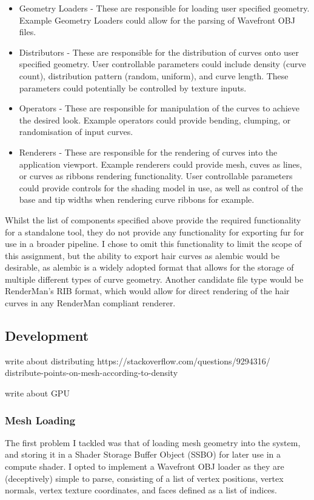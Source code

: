 \documentclass[]{acmsiggraph}
\begin{document}
\begin{itemize}
	\item Geometry Loaders - These are responsible for loading user specified geometry. Example Geometry Loaders could allow for the parsing of Wavefront OBJ files.
	\item Distributors - These are responsible for the distribution of curves onto user specified geometry. User controllable parameters could include density (curve count), distribution pattern (random, uniform), and curve length. These parameters could potentially be controlled by texture inputs.
	\item Operators - These are responsible for manipulation of the curves to achieve the desired look. Example operators could provide bending, clumping, or randomisation of input curves.
	\item Renderers - These are responsible for the rendering of curves into the application viewport. Example renderers could provide mesh, cuves as lines, or curves as ribbons rendering functionality. User controllable parameters could provide controls for the shading model in use, as well as control of the base and tip widths when rendering curve ribbons for example.
\end{itemize}

Whilst the list of components specified above provide the required functionality for a standalone tool, they do not provide any functionality for exporting fur for use in a broader pipeline. I chose to omit this functionality to limit the scope of this assignment, but the ability to export hair curves as alembic would be desirable, as alembic is a widely adopted format that allows for the storage of multiple different types of curve geometry. Another candidate file type would be RenderMan's RIB format, which would allow for direct rendering of the hair curves in any RenderMan compliant renderer.

\subsection{Development} \label{sec:development}

write about distributing https://stackoverflow.com/questions/9294316/
distribute-points-on-mesh-according-to-density

write about GPU

\subsubsection{Mesh Loading} \label{sec:objLoading}
The first problem I tackled was that of loading mesh geometry into the system, and storing it in a Shader Storage Buffer Object (SSBO) for later use in a compute shader. I opted to implement a Wavefront OBJ loader as they are (deceptively) simple to parse, consisting of a list of vertex positions, vertex normals, vertex texture coordinates, and faces defined as a list of indices.
\end{document}
